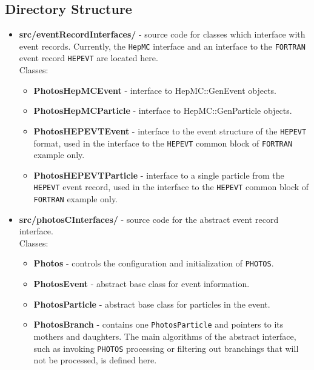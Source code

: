 \documentclass[]{Photos_interface_design}
\begin{document}
\subsection{Directory Structure}

\begin{itemize}
\item {\bf src/eventRecordInterfaces/ } - source code for classes which interface with event records.
      Currently, the {\tt HepMC} interface and an interface to the {\tt FORTRAN} event record {\tt HEPEVT} are located here.\\
  Classes:
  \begin{itemize}
  \item { \bf PhotosHepMCEvent} - interface to HepMC::GenEvent objects. 
  \item { \bf PhotosHepMCParticle} - interface to HepMC::GenParticle objects. 
  \item { \bf PhotosHEPEVTEvent} - interface to the event structure of the {\tt HEPEVT} format, used in the interface to the {\tt HEPEVT} common block of {\tt FORTRAN} example only. 
  \item { \bf PhotosHEPEVTParticle} - interface to a single particle from the {\tt HEPEVT} event record, used in the interface to the {\tt HEPEVT} common block of {\tt FORTRAN} example only.
  \end{itemize}   

\item {\bf src/photosCInterfaces/ } - source code for the abstract event record interface.  \\
  Classes:
  \begin{itemize}
  \item { \bf Photos } - controls the configuration and initialization of {\tt PHOTOS}.
  \item { \bf PhotosEvent } - abstract base class for event information.
  \item { \bf PhotosParticle } - abstract base class for particles in the event.
  \item { \bf PhotosBranch } - contains one {\tt PhotosParticle} and  pointers to its mothers and daughters.
                               The main algorithms of the abstract interface, such as invoking {\tt PHOTOS} processing
                               or filtering out branchings that will not be processed, is defined here.
  \end{itemize}


\end{itemize}
\end{document}
